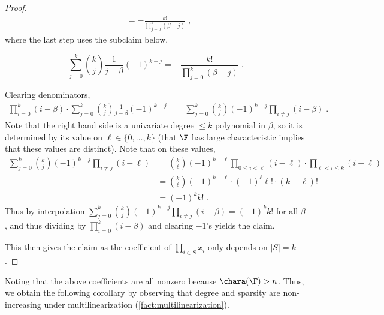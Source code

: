 \documentclass{toc}
\begin{document}
\begin{proof}
\begin{align*}
                &=-\frac{k!}{\prod_{j=0}^k (\beta-j)}
                \;,
        \end{align*}
        where the last step uses the %
            subclaim below.   %
        \begin{subclaim}
                \[
                        \sum_{j=0}^k \binom{k}{j} \frac{1}{j-\beta} (-1)^{k-j}
                        =-\frac{k!}{\prod_{j=0}^k (\beta-j)}
                        \;.
                \]
        \end{subclaim}
        \begin{subproof}
                Clearing denominators,
                \begin{align*}
                        \prod_{i=0}^k (i-\beta)\cdot \sum_{j=0}^k \binom{k}{j} \frac{1}{j-\beta} (-1)^{k-j}
                        &=\sum_{j=0}^k \binom{k}{j}(-1)^{k-j} \prod_{i\ne j} (i-\beta)
                        \;.
                \end{align*}
                Note that the right hand side is a univariate degree $\le k$ polynomial in $\beta$, so it is determined by its value on $\ell\in\{0,\ldots,k\}$ (that $\F$ has large characteristic implies that these values are distinct). Note that on these values,
                \begin{align*}
                        \sum_{j=0}^k \binom{k}{j}(-1)^{k-j} \prod_{i\ne j} (i-\ell)
                        &=\binom{k}{\ell}(-1)^{k-\ell} \prod_{0\le i<\ell} (i-\ell) \cdot  \prod_{\ell<i\le k} (i-\ell)\\
                        &=\binom{k}{\ell}(-1)^{k-\ell} \cdot (-1)^{\ell} \ell! \cdot  (k-\ell)!\\
                        &=(-1)^k k!
                        \;.
                \end{align*}
                Thus by interpolation $\sum_{j=0}^k \binom{k}{j}(-1)^{k-j} \prod_{i\ne j} (i-\beta)=(-1)^k k!$ for all $\beta$, and thus dividing by $\prod_{i=0}^k (i-\beta)$ and clearing $-1$'s yields the claim.
        \end{subproof}
        This then gives the claim as the coefficient of $\prod_{i\in S}x_i$ only depends on $|S|=k$.
\end{proof}

Noting that the above coefficients are all nonzero because $\chara(\F)>n$.  Thus, we obtain the following corollary by observing that degree and sparsity are non-increasing under multilinearization (\autoref{fact:multilinearization}).
\end{document}
